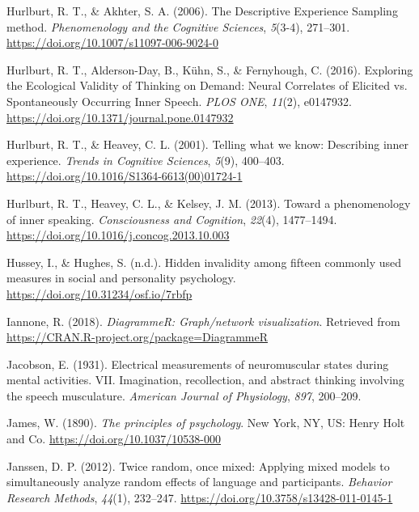 \documentclass[a4paper,12pt,twoside,onecolumn,openright,final,oldfontcommands]{memoir}
\begin{document}
\leavevmode\hypertarget{ref-hurlburt_descriptive_2006}{}%
Hurlburt, R. T., \& Akhter, S. A. (2006). The Descriptive Experience Sampling method. \emph{Phenomenology and the Cognitive Sciences}, \emph{5}(3-4), 271--301. \url{https://doi.org/10.1007/s11097-006-9024-0}

\leavevmode\hypertarget{ref-hurlburt_exploring_2016}{}%
Hurlburt, R. T., Alderson-Day, B., Kühn, S., \& Fernyhough, C. (2016). Exploring the Ecological Validity of Thinking on Demand: Neural Correlates of Elicited vs. Spontaneously Occurring Inner Speech. \emph{PLOS ONE}, \emph{11}(2), e0147932. \url{https://doi.org/10.1371/journal.pone.0147932}

\leavevmode\hypertarget{ref-Hurlburt2001}{}%
Hurlburt, R. T., \& Heavey, C. L. (2001). Telling what we know: Describing inner experience. \emph{Trends in Cognitive Sciences}, \emph{5}(9), 400--403. \url{https://doi.org/10.1016/S1364-6613(00)01724-1}

\leavevmode\hypertarget{ref-Hurlburt2013}{}%
Hurlburt, R. T., Heavey, C. L., \& Kelsey, J. M. (2013). Toward a phenomenology of inner speaking. \emph{Consciousness and Cognition}, \emph{22}(4), 1477--1494. \url{https://doi.org/10.1016/j.concog.2013.10.003}

\leavevmode\hypertarget{ref-hussey_hidden_2018}{}%
Hussey, I., \& Hughes, S. (n.d.). Hidden invalidity among fifteen commonly used measures in social and personality psychology. \url{https://doi.org/10.31234/osf.io/7rbfp}

\leavevmode\hypertarget{ref-R-DiagrammeR}{}%
Iannone, R. (2018). \emph{DiagrammeR: Graph/network visualization}. Retrieved from \url{https://CRAN.R-project.org/package=DiagrammeR}

\leavevmode\hypertarget{ref-jacobson_electrical_1931}{}%
Jacobson, E. (1931). Electrical measurements of neuromuscular states during mental activities. VII. Imagination, recollection, and abstract thinking involving the speech musculature. \emph{American Journal of Physiology}, \emph{897}, 200--209.

\leavevmode\hypertarget{ref-james_principles_1890}{}%
James, W. (1890). \emph{The principles of psychology}. New York, NY, US: Henry Holt and Co. \url{https://doi.org/10.1037/10538-000}

\leavevmode\hypertarget{ref-janssen_twice_2012}{}%
Janssen, D. P. (2012). Twice random, once mixed: Applying mixed models to simultaneously analyze random effects of language and participants. \emph{Behavior Research Methods}, \emph{44}(1), 232--247. \url{https://doi.org/10.3758/s13428-011-0145-1}
\end{document}

